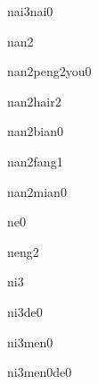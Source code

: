 \begin{multicols}{2}
\begin{verbete}[奶奶]{nai3nai0}
\end{verbete}

\begin{verbete}[男]{nan2}
\end{verbete}

\begin{verbete}[男朋友]{nan2peng2you0}
\end{verbete}

\begin{verbete}[男孩儿]{nan2hair2}
\end{verbete}

\begin{verbete}[南边]{nan2bian0}
\end{verbete}

\begin{verbete}[南方]{nan2fang1}
\end{verbete}

\begin{verbete}[南面]{nan2mian0}
\end{verbete}

\begin{verbete}[呢]{ne0}
\end{verbete}

\begin{verbete}[能]{neng2}
\end{verbete}

\begin{verbete}[你]{ni3}
\end{verbete}

\begin{verbete}[你的]{ni3de0}
\end{verbete}

\begin{verbete}[你们]{ni3men0}
\end{verbete}

\begin{verbete}[你们的]{ni3men0de0}
\end{verbete}


\end{multicols}
